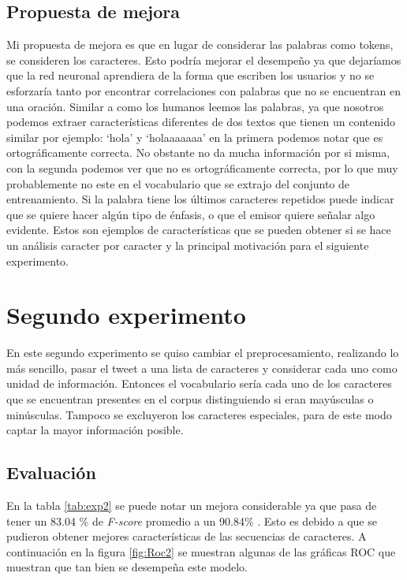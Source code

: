 		
		\subsection{Propuesta de mejora}
		
		\par Mi propuesta de mejora es que en lugar de considerar las palabras como tokens, se consideren los caracteres. Esto podría mejorar el desempeño ya que dejaríamos que la red neuronal aprendiera de la forma que escriben los usuarios y no se esforzaría tanto por encontrar correlaciones con palabras que no se encuentran en una oración. Similar a como los humanos leemos las palabras, ya que nosotros podemos extraer características diferentes de dos textos que tienen un contenido similar por ejemplo: `hola' y `holaaaaaaa' en la primera podemos notar que es ortográficamente correcta. No obstante no da mucha información por si misma, con la segunda podemos ver que no es ortográficamente correcta, por lo que muy probablemente no este en el vocabulario que se extrajo del conjunto de entrenamiento. Si la palabra tiene los últimos caracteres repetidos puede indicar que se quiere hacer algún tipo de énfasis, o que el emisor quiere señalar algo evidente. Estos son ejemplos de características que se pueden obtener si se hace un análisis caracter por caracter y la principal motivación para el siguiente experimento.
		
	\section{Segundo experimento}
	    \par En este segundo experimento se quiso cambiar el preprocesamiento, realizando lo más sencillo, pasar el tweet a una lista de caracteres y considerar cada uno como unidad de información. Entonces el vocabulario sería cada uno de los caracteres que se encuentran presentes en el corpus distinguiendo si eran mayúsculas o minúsculas. Tampoco se excluyeron los caracteres especiales, para de este modo captar la mayor información posible.
		\subsection{Evaluación}
		     \begin{center}
		        
		     \end{center}
		     
		
		\par En la tabla \ref{tab:exp2} se puede notar un mejora considerable ya que pasa de tener un 83.04 \% de \textit{F-score} promedio a un 90.84\% . Esto es debido a que se pudieron obtener mejores características de las secuencias de caracteres. A continuación en la figura \ref{fig:Roc2} se muestran algunas de las gráficas ROC que muestran que tan bien se desempeña este modelo.
		
